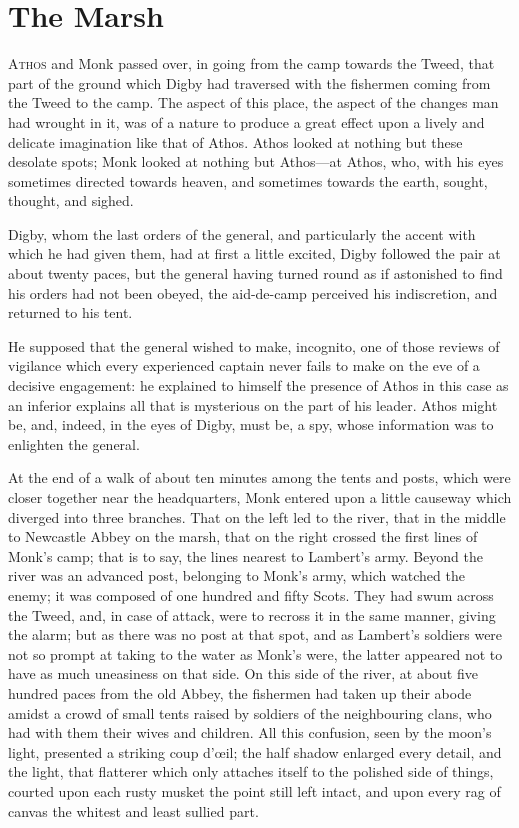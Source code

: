 \chapter{The Marsh}

\lettrine{A}{thos} and Monk passed over, in going from the camp towards the Tweed, that part of the ground which Digby had traversed with the fishermen coming from the Tweed to the camp. The aspect of this place, the aspect of the changes man had wrought in it, was of a nature to produce a great effect upon a lively and delicate imagination like that of Athos. Athos looked at nothing but these desolate spots; Monk looked at nothing but Athos—at Athos, who, with his eyes sometimes directed towards heaven, and sometimes towards the earth, sought, thought, and sighed.

Digby, whom the last orders of the general, and particularly the accent with which he had given them, had at first a little excited, Digby followed the pair at about twenty paces, but the general having turned round as if astonished to find his orders had not been obeyed, the aid-de-camp perceived his indiscretion, and returned to his tent.

He supposed that the general wished to make, incognito, one of those reviews of vigilance which every experienced captain never fails to make on the eve of a decisive engagement: he explained to himself the presence of Athos in this case as an inferior explains all that is mysterious on the part of his leader. Athos might be, and, indeed, in the eyes of Digby, must be, a spy, whose information was to enlighten the general.

At the end of a walk of about ten minutes among the tents and posts, which were closer together near the headquarters, Monk entered upon a little causeway which diverged into three branches. That on the left led to the river, that in the middle to Newcastle Abbey on the marsh, that on the right crossed the first lines of Monk's camp; that is to say, the lines nearest to Lambert's army. Beyond the river was an advanced post, belonging to Monk's army, which watched the enemy; it was composed of one hundred and fifty Scots. They had swum across the Tweed, and, in case of attack, were to recross it in the same manner, giving the alarm; but as there was no post at that spot, and as Lambert's soldiers were not so prompt at taking to the water as Monk's were, the latter appeared not to have as much uneasiness on that side. On this side of the river, at about five hundred paces from the old Abbey, the fishermen had taken up their abode amidst a crowd of small tents raised by soldiers of the neighbouring clans, who had with them their wives and children. All this confusion, seen by the moon's light, presented a striking coup d'œil; the half shadow enlarged every detail, and the light, that flatterer which only attaches itself to the polished side of things, courted upon each rusty musket the point still left intact, and upon every rag of canvas the whitest and least sullied part.

